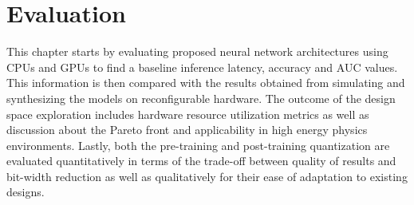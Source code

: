 \chapter{Evaluation}\label{evaluation}
This chapter starts by evaluating proposed neural network architectures using CPUs and GPUs to find a baseline inference latency, accuracy and AUC values. This information is then compared with the results obtained from simulating and synthesizing the models on reconfigurable hardware. The outcome of the design space exploration includes hardware resource utilization metrics as well as discussion about the Pareto front and applicability in high energy physics environments. Lastly, both the pre-training and post-training quantization are evaluated quantitatively in terms of the trade-off between quality of results and bit-width reduction as well as qualitatively for their ease of adaptation to existing designs.





